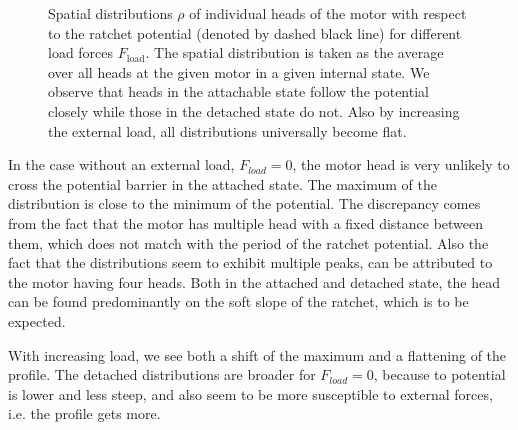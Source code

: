 \documentclass[aps,pre,twocolumn,showpacs,showkeys]{revtex4-1}
\begin{document}
\begin{figure}[t]
\centering
{}
\caption{Spatial distributions $\rho$ of individual heads of the motor with respect to the ratchet potential (denoted by dashed black line) for different load forces $F_\text{load}$.
The spatial distribution is taken as the average over all heads at the given motor in a given internal state.
We observe that heads in the attachable state follow the potential closely while those in the detached state do not. 
Also by increasing the external load, all distributions universally become flat. 
}
\label{Fig: pos_distr}
\end{figure}
In the case without an external load, $F_{load}=0$, the motor head is very unlikely to cross the potential barrier in the attached state. 
The maximum of the distribution is close to the minimum of the potential. 
The discrepancy comes from the fact that the motor has multiple head with a fixed distance between them, which does not match with the period of the ratchet potential. 
Also the fact that the distributions seem to exhibit multiple peaks, can be attributed to the motor having four heads. 
Both in the attached and detached state, the head can be found predominantly on the soft slope of the ratchet, which is to be expected.


With increasing load, we see both a shift of the maximum and a flattening of the profile. 
The detached distributions are broader for $F_{load}=0$, because to potential is lower and less steep, and also seem to be more susceptible to external forces, i.e. the profile gets more. 
\end{document}

